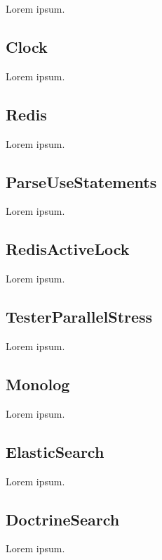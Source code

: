 Lorem ipsum.

\tocless\subsection{Clock} \label{sec:state:clock}

Lorem ipsum.

\tocless\subsection{Redis} \label{sec:state:redis}

Lorem ipsum.

\tocless\subsection{ParseUseStatements} \label{sec:state:parse-use-statements}

Lorem ipsum.

\tocless\subsection{RedisActiveLock} \label{sec:state:redis-active-lock}

Lorem ipsum.

\tocless\subsection{TesterParallelStress} \label{sec:state:tester-parallel-stress}

Lorem ipsum.

\tocless\subsection{Monolog} \label{sec:state:monolog}

Lorem ipsum.

\tocless\subsection{ElasticSearch} \label{sec:state:elastic-search}

Lorem ipsum.

\tocless\subsection{DoctrineSearch} \label{sec:state:doctrine-search}

Lorem ipsum.

